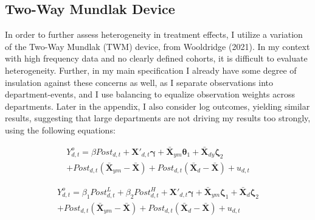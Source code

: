 \clearpage
\subsection{Two-Way Mundlak Device}
In order to further assess heterogeneity in treatment effects, I utilize a variation of the Two-Way Mundlak (TWM) device, from Wooldridge (2021). In my context with high frequency data and no clearly defined cohorts, it is difficult to evaluate heterogeneity. Further, in my main specification I already have some degree of insulation against these concerns as well, as I separate observations into department-events, and I use balancing to equalize observation weights across departments. Later in the appendix, I also consider log outcomes, yielding similar results, suggesting that large departments are not driving my results too strongly, using the following equations: 

\begin{equation}
    	\begin{split}
		Y^{o}_{d,t} = \beta Post_{d,t} + \boldsymbol{X'}_{d,t} \boldsymbol{\gamma} + \boldsymbol{\bar{X}}_{ym} \boldsymbol{\theta}_1 + \boldsymbol{\bar{X}}_{dy} \boldsymbol{\zeta}_2 \\ 
            + Post_{d,t} (\boldsymbol{\bar{X}}_{ym} - \boldsymbol{\bar{X}}) + Post_{d,t} (\boldsymbol{\bar{X}}_{d} - \boldsymbol{\bar{X}}) + u_{d,t} 
    	\label{eq5_TWM_DiD}
	\end{split}
\end{equation}

\begin{equation} 
    	\begin{split}
    		Y^{o}_{d,t} = \beta_1 Post^{L}_{d,t} + \beta_2 Post^{H}_{d,t} + \boldsymbol{X'}_{d,t} \boldsymbol{\gamma} + \boldsymbol{\bar{X}}_{ym} \boldsymbol{\zeta}_1 + \boldsymbol{\bar{X}}_{d} \boldsymbol{\zeta}_2 \\ 
            + Post_{d,t} (\boldsymbol{\bar{X}}_{ym} - \boldsymbol{\bar{X}}) + Post_{d,t} (\boldsymbol{\bar{X}}_{d} - \boldsymbol{\bar{X}}) + u_{d,t} 
    	\label{eq6_TWM_DiDiD}
    	\end{split}
\end{equation}

\begin{table}
	\begin{center}
		
		\caption[Two-Way Mundlak Volume Outcome Estimates]{This table gives volume outcome coefficient estimates for the treatment effect following a shooting event both overall using equation \ref{eq1_DiD} in Panel A and by scrutiny level using equation \ref{eq3_DiDiD} in Panel B. Despite different estimated magnitudes, the sign of these estimates generally align with my main results.}
		\label{full_DiD_volumes_TWM}
	\end{center}
\end{table}

